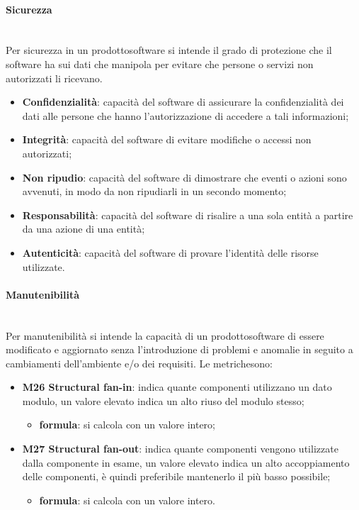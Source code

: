	\paragraph{Sicurezza} \mbox{}\\
	Per sicurezza in un prodotto\glosp software si intende il grado di protezione che il software ha sui dati che manipola per evitare che persone o servizi non autorizzati li ricevano.
	\begin{itemize}
		\item \textbf{Confidenzialità}: capacità del software di assicurare la confidenzialità dei dati alle persone che hanno l'autorizzazione di accedere a tali informazioni;
		\item \textbf{Integrità}: capacità del software di evitare modifiche o accessi non autorizzati;
		\item \textbf{Non ripudio}: capacità del software di dimostrare che eventi o azioni sono avvenuti, in modo da non ripudiarli in un secondo momento;
		\item \textbf{Responsabilità}: capacità del software di risalire a una sola entità a partire da una azione di una entità;
		\item \textbf{Autenticità}: capacità del software di provare l'identità delle risorse utilizzate.
	\end{itemize}

	\paragraph{Manutenibilità} \mbox{}\\[1mm]
	Per manutenibilità si intende la capacità di un prodotto\glosp software di essere modificato e aggiornato senza l'introduzione di problemi e anomalie in seguito a cambiamenti dell'ambiente e/o dei requisiti.
	Le metriche\glosp sono:
	\begin{itemize}
		\item \textbf{M26 Structural fan-in}: indica quante componenti utilizzano un dato modulo, un valore elevato indica un alto riuso del modulo stesso;
		\begin{itemize}
			\item[] \textbf{formula}: si calcola con un valore intero;
		\end{itemize}
		\item \textbf{M27 Structural fan-out}: indica quante componenti vengono utilizzate dalla componente in esame, un valore elevato indica un alto accoppiamento delle componenti, è quindi preferibile mantenerlo il più basso possibile;
		\begin{itemize}
			\item[] \textbf{formula}: si calcola con un valore intero.
		\end{itemize}
	\end{itemize}
